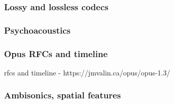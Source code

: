 \documentclass{beamer}
\begin{document}
\begin{frame}
	\frametitle{Lossy and lossless codecs}
\end{frame}

\begin{frame}
	\frametitle{Psychoacoustics}
\end{frame}

\begin{frame}
	\frametitle{Opus RFCs and timeline}
	rfcs and timeline - https://jmvalin.ca/opus/opus-1.3/
\end{frame}


\begin{frame}
	\frametitle{Ambisonics, spatial features}
\end{frame}

\end{document}
